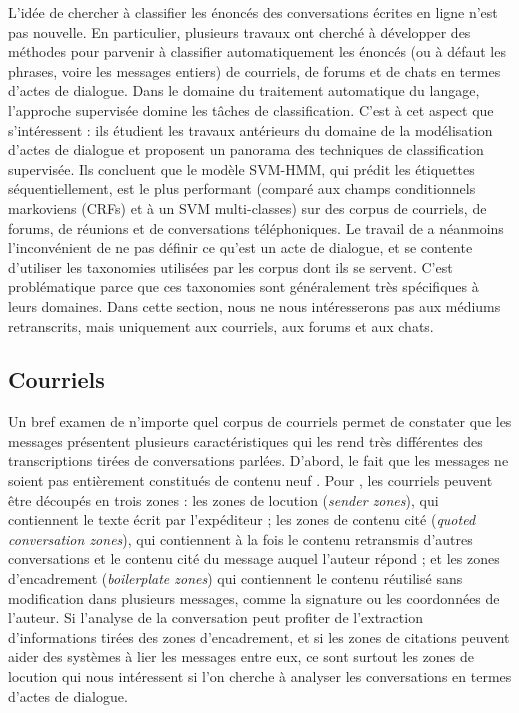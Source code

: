 \documentclass[10pt,a4paper,twoside]{article}
\begin{document}
L'idée de chercher à classifier les énoncés des conversations écrites en ligne n'est pas nouvelle. En particulier, plusieurs travaux ont cherché à développer des méthodes pour parvenir à classifier automatiquement les énoncés (ou à défaut les phrases, voire les messages entiers) de courriels, de forums et de chats en termes d'actes de dialogue. Dans le domaine du traitement automatique du langage, l'approche supervisée domine les tâches de classification. C'est à cet aspect que s'intéressent \citet{tavafi2013dialogue} : ils étudient les travaux antérieurs du domaine de la modélisation d'actes de dialogue et proposent un panorama des techniques de classification supervisée. Ils concluent que le modèle SVM-HMM, qui prédit les étiquettes séquentiellement, est le plus performant (comparé aux champs conditionnels markoviens (CRFs) et à un SVM multi-classes) sur des corpus de courriels, de forums, de réunions et de conversations téléphoniques. Le travail de \citeauthor{tavafi2013dialogue} a néanmoins l'inconvénient de ne pas définir ce qu'est un acte de dialogue, et se contente d'utiliser les taxonomies utilisées par les corpus dont ils se servent. C'est problématique parce que ces taxonomies sont généralement très spécifiques à leurs domaines. Dans cette section, nous ne nous intéresserons pas aux médiums retranscrits, mais uniquement aux courriels, aux forums et aux chats.

\subsection{Courriels}
\label{subsec:emails}

Un bref examen de n'importe quel corpus de courriels permet de constater que les messages présentent plusieurs caractéristiques qui les rend très différentes des transcriptions tirées de conversations parlées. D'abord, le fait que les messages ne soient pas entièrement constitués de contenu \og neuf \fg. Pour \citet{lampert2009segmenting}, les courriels peuvent être découpés en trois zones : les zones de locution (\textit{sender zones}), qui contiennent le texte écrit par l'expéditeur ; les zones de contenu cité (\textit{quoted conversation zones}), qui contiennent à la fois le contenu retransmis d'autres conversations et le contenu cité du message auquel l'auteur répond ; et les zones d'encadrement (\textit{boilerplate zones}) qui contiennent le contenu réutilisé sans modification dans plusieurs messages, comme la signature ou les coordonnées de l'auteur. Si l'analyse de la conversation peut profiter de l'extraction d'informations tirées des zones d'encadrement, et si les zones de citations peuvent aider des systèmes à lier les messages entre eux, ce sont surtout les zones de locution qui nous intéressent si l'on cherche à analyser les conversations en termes d'actes de dialogue.
\end{document}
